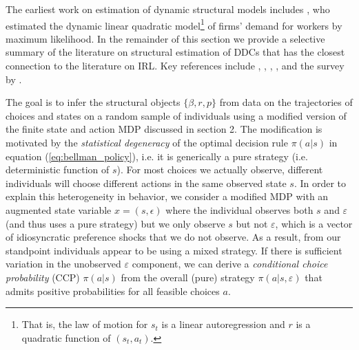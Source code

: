 The earliest work on estimation of dynamic structural models includes 
\citet{sargent:1978}, who estimated the dynamic linear quadratic model\footnote{\footnotesize That is, the law of motion for $s_t$ is a linear autoregression 
and $r$ is a quadratic function of $(s_t,a_t)$.} of firms' demand for workers by maximum likelihood. 
In the remainder of this section we provide a selective summary of the literature on structural estimation of DDCs that has the closest connection to 
the literature on IRL. Key references include \citet{rust:1987}, \citet{rust:1988}, \citet{rust:1994}, \citet{AguirregabiriaMira:2002},
and the survey by \citet{AguirregabiriaMira:2010}. 

The goal is to infer the structural objects
$\{\beta,r,p\}$ from data on the trajectories of choices and states on a random sample of individuals 
using a modified version of the finite state and action MDP discussed in section 2.  
The modification is motivated by the {\it statistical degeneracy\/} of the optimal decision rule $\pi(a|s)$ 
in equation (\ref{eq:bellman_policy}), i.e. it is generically a pure strategy (i.e. deterministic function of $s$). 
For most choices we actually observe, different individuals will choose different actions in the same
observed state $s$.  In order to explain this heterogeneity in behavior, we consider a modified MDP with an augmented
state variable $x=(s,\epsilon)$ where the individual
observes both $s$ and $\varepsilon$ (and thus uses a pure strategy) but we only observe $s$  but not $\varepsilon$, which 
is a vector of idiosyncratic preference shocks that we do not observe. As a result, from our standpoint
individuals appear to be using a mixed strategy. If there is sufficient variation
in the unobserved $\varepsilon$ component, we can derive a {\it conditional choice probability\/} (CCP) $\pi(a|s)$  from the overall (pure)
strategy $\pi(a|s,\varepsilon)$ that admits positive probabilities for all feasible choices $a$.

